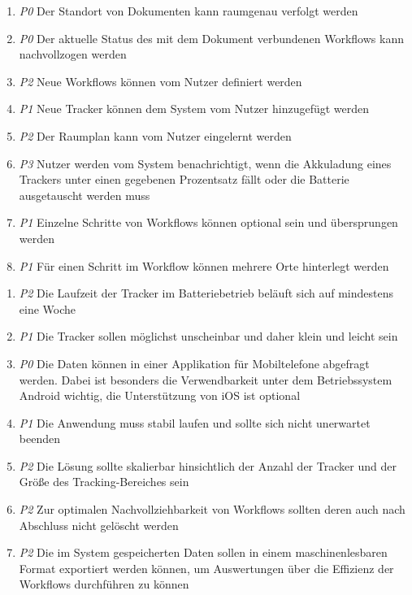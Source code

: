 \begin{enumerate}[label=\textbf{F-\arabic*}]
	\item \label{fa:tracking} \textit{P0} Der Standort von Dokumenten kann raumgenau verfolgt werden
	\item \label{fa:workflow} \textit{P0} Der aktuelle Status des mit dem Dokument verbundenen
		Workflows kann nachvollzogen werden
	\item \label{fa:neue-workflows} \textit{P2} Neue Workflows können vom Nutzer definiert werden
	\item \label{fa:neue-tracker} \textit{P1}  Neue Tracker können dem System vom Nutzer hinzugefügt werden
	\item \label{fa:raumplan} \textit{P2}  Der Raumplan kann vom Nutzer eingelernt werden
	\item \label{fa:benachrichtigung} \textit{P3} Nutzer werden vom System benachrichtigt, wenn die Akkuladung eines
	Trackers unter einen gegebenen Prozentsatz fällt oder die Batterie ausgetauscht werden muss
	\item \label{fa:optionale-schritte} \textit{P1} Einzelne Schritte von Workflows können optional sein und
	übersprungen werden
	\item \label{fa:mehrere-orte} \textit{P1}  Für einen Schritt im Workflow können mehrere Orte hinterlegt werden
\end{enumerate}


\begin{enumerate}[label=\textbf{NF-\arabic*}]
	\item \label{nf:akku} \textit{P2}  Die Laufzeit der Tracker im Batteriebetrieb beläuft sich auf mindestens eine Woche
	\item \label{nf:klein} \textit{P1}  Die Tracker sollen möglichst unscheinbar und daher klein und leicht sein
	\item \label{nf:app} \textit{P0}  Die Daten können in einer Applikation für Mobiltelefone abgefragt werden.  Dabei ist besonders die Verwendbarkeit unter dem Betriebssystem Android wichtig, die Unterstützung von iOS ist optional
	\item \label{nf:stabilität} \textit{P1}  Die Anwendung muss stabil laufen und sollte sich nicht unerwartet beenden
	\item \label{nf:skalierbarkeit} \textit{P2}  Die Lösung sollte skalierbar hinsichtlich der Anzahl der Tracker und der Größe des Tracking-Bereiches sein
	\item \label{nf:nachvollziehbarkeit} \textit{P2}  Zur optimalen Nachvollziehbarkeit von Workflows sollten deren auch nach Abschluss nicht gelöscht werden
	\item \label{nf:datenexport} \textit{P2}  Die im System gespeicherten Daten sollen in einem maschinenlesbaren Format exportiert werden können, um Auswertungen über die Effizienz der Workflows durchführen zu können
\end{enumerate}
